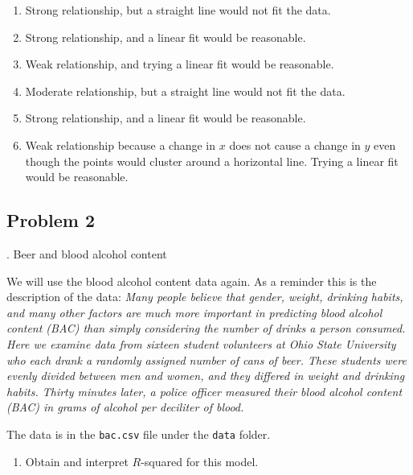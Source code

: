 \documentclass[
]{book}
\providecommand{\tightlist}{%
  \setlength{\itemsep}{0pt}\setlength{\parskip}{0pt}}
\begin{document}
\begin{enumerate}
\def\labelenumi{(\alph{enumi})}
\tightlist
\item
  Strong relationship, but a straight line would not fit the data.\\
\item
  Strong relationship, and a linear fit would be reasonable.\\
\item
  Weak relationship, and trying a linear fit would be reasonable.\\
\item
  Moderate relationship, but a straight line would not fit the data.\\
\item
  Strong relationship, and a linear fit would be reasonable.\\
\item
  Weak relationship because a change in \(x\) does not cause a change in \(y\) even though the points would cluster around a horizontal line. Trying a linear fit would be reasonable.
\end{enumerate}

\hypertarget{problem-2-25}{%
\subsection{Problem 2}\label{problem-2-25}}

. Beer and blood alcohol content

We will use the blood alcohol content data again. As a reminder this is the description of the data: \emph{Many people believe that gender, weight, drinking habits, and many other factors are much more important in predicting blood alcohol content (BAC) than simply considering the number of drinks a person consumed. Here we examine data from sixteen student volunteers at Ohio State University who each drank a randomly assigned number of cans of beer. These students were evenly divided between men and women, and they differed in weight and drinking habits. Thirty minutes later, a police officer measured their blood alcohol content (BAC) in grams of alcohol per deciliter of blood.}

The data is in the \texttt{bac.csv} file under the \texttt{data} folder.

\begin{enumerate}
\def\labelenumi{\alph{enumi}.}
\tightlist
\item
  Obtain and interpret \(R\)-squared for this model.
\end{enumerate}
\end{document}

